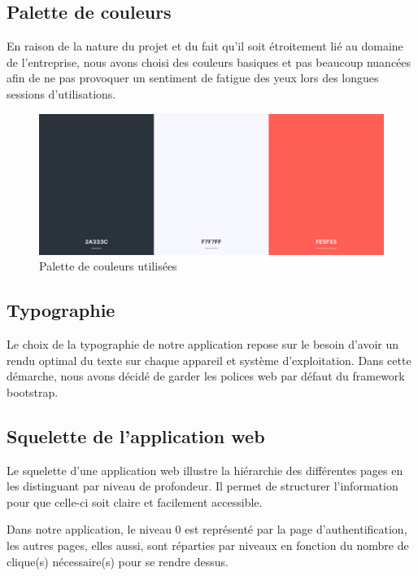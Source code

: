 \subsection{Palette de couleurs}
En raison de la nature du projet et du fait qu’il soit étroitement lié au
domaine de l'entreprise, nous avons choisi des couleurs basiques et pas beaucoup
nuancées afin de ne pas provoquer un sentiment de fatigue  des yeux lors des
longues sessions d'utilisations.

\begin{figure}[h!]
    \centering
    \includegraphics[scale=0.3 ]{images/palette_couleurs.PNG}
    \caption{Palette de couleurs utilisées}
    \label{fig89}
\end{figure} 

\subsection{Typographie}
Le choix de la typographie de notre application repose sur le besoin d’avoir un 
rendu optimal du texte sur chaque appareil et système d'exploitation. Dans cette 
démarche, nous avons décidé de garder les polices web par défaut du framework 
bootstrap.

\subsection{Squelette de l'application web}
Le squelette d’une application web illustre la hiérarchie des différentes pages
en les distinguant par niveau de profondeur. Il permet de structurer
l’information pour que celle-ci soit claire et facilement accessible.

Dans notre application, le niveau 0 est représenté par la page 
d’authentification, les autres pages, elles aussi, sont réparties par niveaux 
en fonction du nombre de clique(s) nécessaire(s) pour se rendre dessus.


